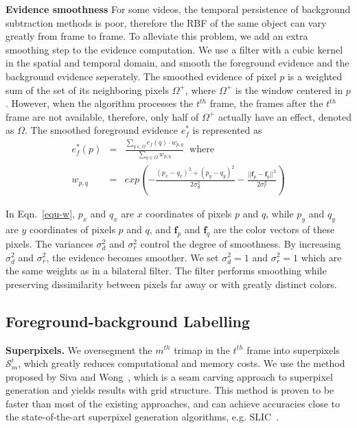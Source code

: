 \textbf{Evidence smoothness}
For some videos, the temporal persistence of background subtraction methods is poor, therefore the RBF of the same object can vary greatly from frame to frame.
To alleviate this problem, we add an extra smoothing step to the evidence computation. We use a filter with a cubic kernel in the spatial and temporal domain, and smooth the foreground evidence and the background evidence seperately.
The smoothed evidence of pixel $p$ is a weighted sum of the set of its neighboring pixels $\Omega^{+}$, where $\Omega^{+}$ is the window centered in $p$.
However, when the algorithm processes the $t^{th}$ frame, the frames after the $t^{th}$ frame are not available, therefore, only half of $\Omega^{+}$ actually have an effect, denoted as $\Omega$. The smoothed foreground evidence $e_{f}^{*}$ is represented as
\begin{eqnarray}
	e_{f}^{*}(p)&=&\frac{\sum_{q\in\Omega}{e_{f}(q)\cdot w_{p,q}}}{\sum_{q\in\Omega}{w_{p,q}}} \;\; \mbox{where} \label{equ-w} \\
	w_{p,q}&=&exp(-\frac{(p_{x}-q_{x})^2+(p_{y}-q_{y})^2}{2\sigma_{d}^{2}}-\frac{||\mathbf{f}_{p}-\mathbf{f}_{q}||^2}{2\sigma_{r}^2}) \nonumber
\end{eqnarray}

In Eqn.~\ref{equ-w}, $p_{x}$ and $q_{x}$ are $x$ coordinates of pixels $p$ and $q$, while $p_{y}$ and $q_{y}$ are $y$ coordinates of pixels $p$ and $q$, and $\mathbf{f}_{p}$ and $\mathbf{f}_{q}$ are the color vectors of these pixels.
The variances $\sigma_{d}^{2}$ and $\sigma_{r}^2$ control the degree of smoothness. By increasing $\sigma_{d}^{2}$ and $\sigma_{r}^2$, the evidence becomes smoother. We set $\sigma_{d}^{2}=1$ and $\sigma_{r}^2=1$ which are the same weights as in a bilateral filter. The filter performs smoothing while preserving dissimilarity between pixels far away or with greatly distinct colors.

\subsection{Foreground-background Labelling}
\label{method-fbl}

\textbf{Superpixels.}
We oversegment the $m^{th}$ trimap in the $t^{th}$ frame into superpixels $\mathcal{S}_{m}^{t}$, which greatly reduces computational and memory costs.
We use the method proposed by Siva and Wong~\cite{siva2014}, which is a seam carving approach to superpixel generation and yields results with grid structure. This method is proven to be faster than most of the existing approaches, and can achieve accuracies close to the state-of-the-art superpixel generation algorithms, e.g. SLIC~\cite{achanta2012}.

